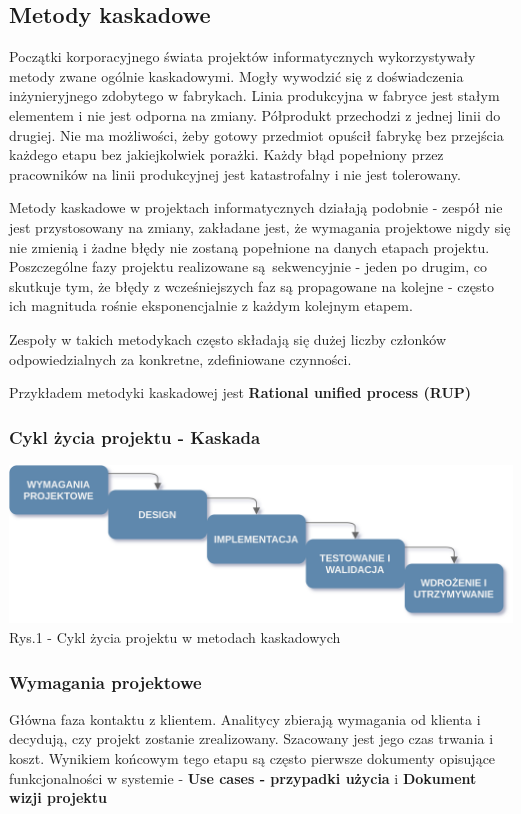 \documentclass{article}
\begin{document}
\subsection{Metody kaskadowe}
Początki korporacyjnego świata projektów informatycznych wykorzystywały metody zwane ogólnie kaskadowymi. Mogły wywodzić się z doświadczenia inżynieryjnego zdobytego w fabrykach\cite{scrum}. Linia produkcyjna w fabryce jest
stałym elementem i nie jest odporna na zmiany. Półprodukt przechodzi z jednej linii do drugiej. Nie ma możliwości, żeby gotowy przedmiot opuścił fabrykę bez przejścia każdego etapu bez jakiejkolwiek porażki.
Każdy błąd popełniony przez pracowników na linii produkcyjnej jest katastrofalny i nie jest tolerowany.

Metody kaskadowe w projektach informatycznych działają podobnie - zespół nie jest przystosowany na zmiany, zakładane jest, że wymagania projektowe nigdy się nie zmienią i żadne błędy nie zostaną popełnione na danych etapach projektu. Poszczególne fazy projektu realizowane są sekwencyjnie - jeden po drugim, co skutkuje tym, że błędy z wcześniejszych faz są propagowane na kolejne - często ich magnituda rośnie eksponencjalnie z każdym kolejnym etapem.

Zespoły w takich metodykach często składają się dużej liczby członków odpowiedzialnych za konkretne, zdefiniowane czynności.

Przykładem metodyki kaskadowej jest \textbf{Rational unified process (RUP)}

\subsubsection{Cykl życia projektu - Kaskada}
\begin{center}
    \includegraphics[scale=0.25]{waterfall_diagram.png}
    \newline
    Rys.1 - Cykl życia projektu w metodach kaskadowych
\end{center}

\subsubsection*{Wymagania projektowe}
Główna faza kontaktu z klientem. Analitycy zbierają wymagania od klienta i decydują, czy projekt zostanie zrealizowany. Szacowany jest jego czas trwania i koszt. Wynikiem końcowym tego etapu są często pierwsze dokumenty opisujące funkcjonalności w systemie - \textbf{Use cases - przypadki użycia} i \textbf{Dokument wizji projektu}
\end{document}
